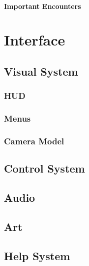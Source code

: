 \documentclass[12pt]{article}
\begin{document}
\paragraph{Important Encounters}

\section{Interface}

\subsection{Visual System}

\subsubsection{HUD}

\subsubsection{Menus}

\subsubsection{Camera Model}

\subsection{Control System}

\subsection{Audio}

\subsection{Art}

\subsection{Help System}
\end{document}
